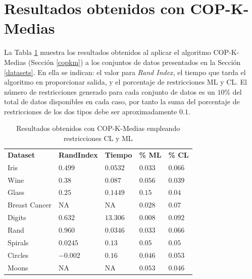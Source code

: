 \section{Resultados obtenidos con COP-K-Medias}

La Tabla \ref{tab:tabla5} muestra los resultados obtenidos al aplicar el algoritmo COP-K-Medias (Sección \ref{copkm}) a los conjuntos de datos presentados en la Sección \ref{datasets}. En ella se indican: el valor para \textit{Rand Index}, el tiempo que tarda el algoritmo en proporcionar salida, y el porcentaje de restricciones \acs{ML} y \acs{CL}. El número de restricciones generado para cada conjunto de datos es un $10\%$ del total de datos disponibles en cada caso, por tanto la suma del porcentaje de restricciones de los dos tipos debe ser aproximadamente $0.1$.

\begin{table}[!h]
	\centering
	\setlength{\arrayrulewidth}{1mm}
	\setlength{\tabcolsep}{10pt}
	\renewcommand{\arraystretch}{0.75}
	
	\begin{tabular}{ >{\centering\arraybackslash}m{2.5cm}  >{\centering\arraybackslash}m{1.8cm}>{\centering\arraybackslash}m{1.5cm}>{\centering\arraybackslash}m{1.2cm}>{\centering\arraybackslash}m{1.2cm}}
		\hline
		\rowcolor{black}
		\multicolumn{5}{c}{\bf \color{white}{Resultados de COP-K-Medias con restricciones CL y ML}}\\
		\hline
		\rowcolor{gray!50}
		\textbf{Dataset} & \textbf{RandIndex} & \textbf{Tiempo} & \textbf{\% ML} & \textbf{\% CL}  \\
		Iris & $0.499$ & $0.0532$ & $0.033$ & $0.066$ \\
		Wine & $0.38$ & $0.087$ & $0.056$ & $0.039$ \\
		Glass  & $0.25$ & $0.1449$ & $0.15$ & $0.04$ \\
		Breast Cancer & NA & NA & $0.028$ & $0.07$ \\ 
		Digits & $0.632$ & $13.306$ & $0.008$ & $0.092$ \\
		Rand & $0.960$ & $0.0346$ & $0.033$ & $0.066$ \\
		Spirals & $0.0245$ & $0.13$ & $0.05$ & $0.05$ \\
		Circles & $-0.002$ & $0.16$ & $0.046$ & $0.053$ \\
		Moons & NA & NA & $0.053$ & $0.046$ \\
		\hline
		
	\end{tabular}
	\caption{Resultados obtenidos con COP-K-Medias empleando restricciones \acs{CL} y \acs{ML}}
	\label{tab:tabla5}
\end{table}


